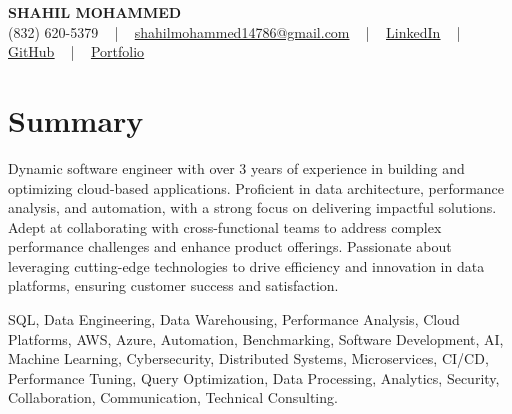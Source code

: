 \documentclass[letterpaper,10pt]{article}
\begin{document}
\begin{center}
    {\fontsize{14pt}{12pt}\selectfont \textbf{\MakeUppercase{Shahil Mohammed}}}\\ \vspace{2pt}
    \fontsize{10pt}{12pt}\selectfont (832) 620-5379 ~ | ~ \href{mailto:shahilmohammed14786@gmail.com}{shahilmohammed14786@gmail.com} ~ | ~  
    \href{https://www.linkedin.com/in/shahil-mohammed-9652931a1/}{\color{blue}\underline{LinkedIn}}  ~ | ~ 
    \href{https://github.com/freakbeast14}{\color{blue}\underline{GitHub}} ~ | ~ 
    \href{https://shahil-mohammed.netlify.app/}{\color{blue}\underline{Portfolio}}
    \vspace{-8pt}
\end{center}

\section{Summary}
\vspace{-2pt}\fontsize{8pt}{9pt}\selectfont
Dynamic software engineer with over 3 years of experience in building and optimizing cloud-based applications. Proficient in data architecture, performance analysis, and automation, with a strong focus on delivering impactful solutions. Adept at collaborating with cross-functional teams to address complex performance challenges and enhance product offerings. Passionate about leveraging cutting-edge technologies to drive efficiency and innovation in data platforms, ensuring customer success and satisfaction.
 \vspace{-5pt}
 
{\fontsize{1pt}{1pt}\selectfont\color{white}
SQL, Data Engineering, Data Warehousing, Performance Analysis, Cloud Platforms, AWS, Azure, Automation, Benchmarking, Software Development, AI, Machine Learning, Cybersecurity, Distributed Systems, Microservices, CI/CD, Performance Tuning, Query Optimization, Data Processing, Analytics, Security, Collaboration, Communication, Technical Consulting.
}
\vspace{-8pt}

\vspace{-2pt}
\end{document}
